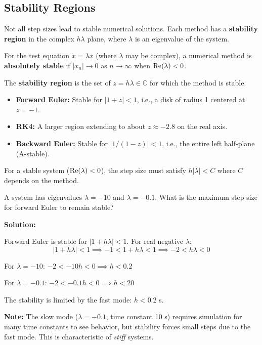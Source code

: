 \subsection{Stability Regions}

Not all step sizes lead to stable numerical solutions. Each method has a \textbf{stability region} in the complex $h\lambda$ plane, where $\lambda$ is an eigenvalue of the system.

\begin{definitionbox}[title=Definition 11.13: Absolute Stability Region]
For the test equation $\dot{x} = \lambda x$ (where $\lambda$ may be complex), a numerical method is \textbf{absolutely stable} if $|x_n| \to 0$ as $n \to \infty$ when $\operatorname{Re}(\lambda) < 0$.

The \textbf{stability region} is the set of $z = h\lambda \in \mathbb{C}$ for which the method is stable.
\end{definitionbox}

\begin{keyconceptbox}[title=Stability Regions of Common Methods]
\begin{itemize}
    \item \textbf{Forward Euler:} Stable for $|1 + z| < 1$, i.e., a disk of radius 1 centered at $z = -1$.
    \item \textbf{RK4:} A larger region extending to about $z \approx -2.8$ on the real axis.
    \item \textbf{Backward Euler:} Stable for $|1/(1-z)| < 1$, i.e., the entire left half-plane (A-stable).
\end{itemize}

For a stable system ($\operatorname{Re}(\lambda) < 0$), the step size must satisfy $h|\lambda| < C$ where $C$ depends on the method.
\end{keyconceptbox}

\begin{examplebox}[title=Example 11.9: Stability Constraint on Step Size]
A system has eigenvalues $\lambda = -10$ and $\lambda = -0.1$. What is the maximum step size for forward Euler to remain stable?

\textbf{Solution:}

Forward Euler is stable for $|1 + h\lambda| < 1$. For real negative $\lambda$:
\begin{equation*}
|1 + h\lambda| < 1 \implies -1 < 1 + h\lambda < 1 \implies -2 < h\lambda < 0
\end{equation*}

For $\lambda = -10$: $-2 < -10h < 0 \implies h < 0.2$

For $\lambda = -0.1$: $-2 < -0.1h < 0 \implies h < 20$

The stability is limited by the fast mode: $h < 0.2$ s.

\textbf{Note:} The slow mode ($\lambda = -0.1$, time constant 10 s) requires simulation for many time constants to see behavior, but stability forces small steps due to the fast mode. This is characteristic of \textit{stiff} systems.
\end{examplebox}

